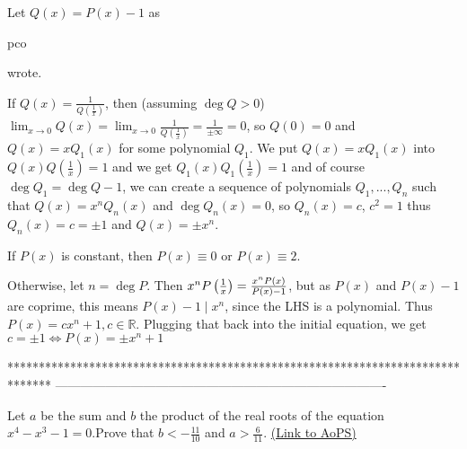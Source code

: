 \begin{solution}
	Let $Q(x) = P(x) - 1$ as \begin{bolded}pco\end{bolded} wrote.

If $Q(x) = \frac{1}{Q(\frac{1}{x})}$, then (assuming $\deg Q > 0$) $\lim_{x\to 0} Q(x) = \lim_{x\to 0} \frac{1}{Q(\frac{1}{x})} = \frac{1}{\pm \infty} = 0$, so $Q(0) = 0$ and $Q(x) = xQ_1(x)$ for some polynomial $Q_1$. We put $Q(x) = xQ_1(x)$ into $Q(x)Q(\frac{1}{x}) = 1$ and we get $Q_1(x)Q_1(\frac{1}{x}) = 1$ and of course $\deg Q_1 = \deg Q - 1$, we can create a sequence of polynomials $Q_1, ..., Q_n$ such that $Q(x) = x^nQ_n(x)$ and $\deg Q_n(x) = 0$, so $Q_n(x) = c$, $c^2 = 1$ thus $Q_n(x) = c = \pm 1$ and $Q(x) = \pm x^n$.
\end{solution}



\begin{solution}
	If $P(x)$ is constant, then $P(x)\equiv 0$ or $P(x)\equiv 2$.

Otherwise, let $n=\deg P$. Then $x^nP\left({1\over x}\right)={x^nP(x)\over P(x)-1}$, but as $P(x)$ and $P(x)-1$ are coprime, this means $P(x)-1\mid x^n$, since the LHS is a polynomial. Thus $P(x)=cx^n+1, c\in\mathbb{R}$. Plugging that back into the initial equation, we get $c=\pm 1\iff P(x)=\pm x^n+1$
\end{solution}
*******************************************************************************
-------------------------------------------------------------------------------

\begin{problem}
	Let $a$ be the sum and $b$ the product of the real roots of the equation $x^4-x^3-1=0$.Prove that $b<-\frac{11}{10}$ and $a>\frac{6}{11}$.
	\flushright \href{https://artofproblemsolving.com/community/c6h558513}{(Link to AoPS)}
\end{problem}



